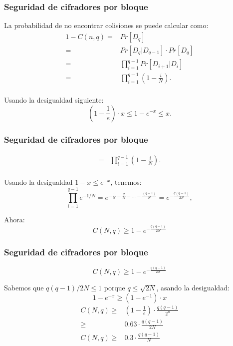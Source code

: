 \documentclass{beamer}
\begin{document}
\frame
{
	\frametitle{Seguridad de cifradores por bloque}

	La probabilidad de no encontrar colisiones se puede calcular como:\\
	
	\begin{align*}
    1-C(n,q) = & Pr\left[D_q\right]\\
             = & Pr\left[D_q|D_{q-1}\right]\cdot Pr\left[D_q\right]\\
             = & \prod_{i=1}^{q-1} Pr\left[D_{i+1}|D_{i}\right]\\
             = & \prod_{i=1}^{q-1} \left(1-\frac{i}{N}\right).\\
	\end{align*}

Usando la desigualdad siguiente:\\

$$\left(1 - \frac{1}{e} \right) \cdot x \leq 1 - e^{-x} \leq x.$$

}

\frame
{

	\frametitle{Seguridad de cifradores por bloque}
	\begin{align*}
              = & \prod_{i=1}^{q-1} \left(1-\frac{i}{N}\right).\\
	\end{align*}

Usando la desigualdad $1-x \leq e^{-x}$, tenemos:\\

$$\prod_{i=1}^{q-1} e^{-1/N}=e^{-\frac{1}{N}-\frac{2}{N}-...-\frac{(q-1)}{N}}=e^{-\frac{q(q-1)}{2N}},$$

Ahora:\\

$$C(N,q)\geq  1 -   e^{-\frac{q(q-1)}{2N}}$$

}

\frame
{

	\frametitle{Seguridad de cifradores por bloque}
$$C(N,q)\geq  1 -   e^{-\frac{q(q-1)}{2N}}$$

Sabemos que $q(q-1)/2N\leq 1$ porque $q \leq \sqrt{2N}$, asando la desigualdad:
$$1-e^{-x}\geq (1-e^{-1})\cdot x$$
\begin{align*}
C(N,q)\geq &\left( 1 - \frac{1}{e} \right) \cdot  \frac{q(q-1)}{2^n}\\
      \geq &  0.63 \cdot  \frac{q(q-1)}{2N}\\ 
      C(N,q)\geq & 0.3 \cdot  \frac{q(q-1)}{N}
\end{align*}

}
\end{document}
